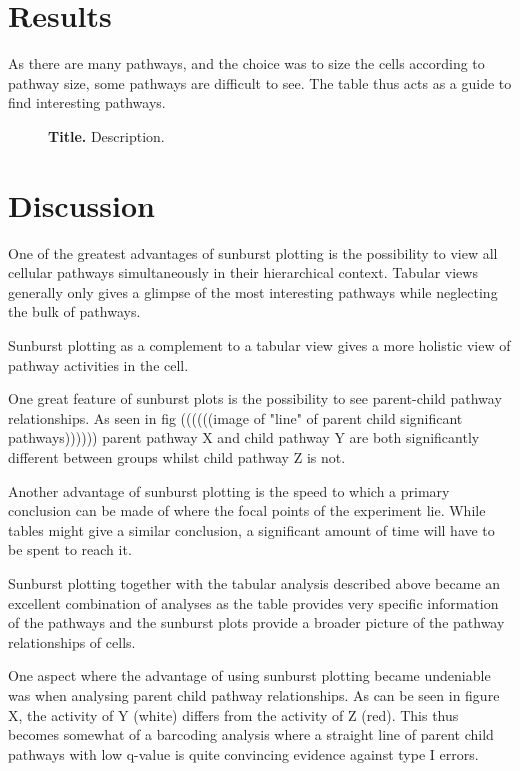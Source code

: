 \documentclass[11pt]{article}
\renewcommand{\includegraphics}[2][]{}
\begin{document}
\section*{Results}


  As there are many pathways, and the choice was to size the cells according to pathway size, some pathways are difficult to see. The table thus acts as a guide to find interesting pathways.


\begin{figure}[htp]
\begin{center}
\caption{\label{fig:id-stats} {\bf Title.} Description.}
\end{center}
\end{figure}

\section*{Discussion}
  One of the greatest advantages of sunburst plotting is the possibility to view all cellular pathways simultaneously in their hierarchical context. Tabular views generally only gives a glimpse of the most interesting pathways while neglecting the bulk of pathways.

  Sunburst plotting as a complement to a tabular view gives a more holistic view of pathway activities in the cell.

  One great feature of sunburst plots is the possibility to see parent-child pathway relationships. As seen in fig  ((((((image of "line" of parent child significant pathways)))))) parent pathway X and child pathway Y are both significantly different between groups whilst child pathway Z is not.


  Another advantage of sunburst plotting is the speed to which a primary conclusion can be made of where the focal points of the experiment lie. While tables might give a similar conclusion, a significant amount of time will have to be spent to reach it.

  Sunburst plotting together with the tabular analysis described above became an excellent combination of analyses as the table provides very specific information of the pathways and the sunburst plots provide a broader picture of the pathway relationships of cells.

  One aspect where the advantage of using sunburst plotting became undeniable was when analysing parent child pathway relationships. As can be seen in figure X, the activity of Y (white) differs from the activity of Z (red). This thus becomes somewhat of a barcoding analysis where a straight line of parent child pathways with low q-value is quite convincing evidence against type I errors.
\end{document}
